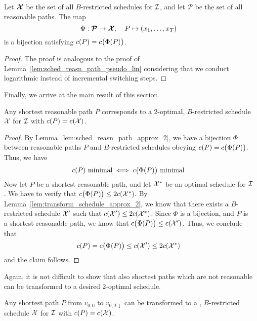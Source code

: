 \begin{lem}\label{lem:sched_reasn_path_approx_2}
Let $\bm{\mathcal{X}}$ be the set of all $B$-restricted schedules for $\mathcal{I}$, and let $\bm{\mathcal{P}}$ be the set of all reasonable paths. The map
\begin{equation*}
	\Phi:\bm{\mathcal{P}}\rightarrow\bm{\mathcal{X}},\quad P\mapsto (x_1,\dotsc,x_T)
\end{equation*}
is a bijection satisfying $c(P)=c\bigl(\Phi(P)\bigr)$.
\end{lem}
\begin{proof}
The proof is analogous to the proof of Lemma~\ref{lem:sched_reasn_path_pseudo_lin} considering that we conduct logarithmic instead of incremental switching steps.
\end{proof}
Finally, we arrive at the main result of this section.
\begin{thm}\label{thm:approx_2}
Any shortest reasonable path $P$ corresponds to a 2-optimal, $B$-restricted schedule $\mathcal{X}$ for $\mathcal{I}$ with $c(P)=c(\mathcal{X})$.
\end{thm} 
\begin{proof}
By Lemma~\ref{lem:sched_reasn_path_approx_2}, we have a bijection $\Phi$ between reasonable paths $P$ and $B$-restricted schedules obeying $c(P)=c\bigl(\Phi(P)\bigr)$. Thus, we have 
\begin{equation*}
	c(P)\text{ minimal}\iff c\bigl(\Phi(P)\big)\text{ minimal}
\end{equation*}
Now let $P$ be a shortest reasonable path, and let $\mathcal{X}^*$ be an optimal schedule for $\mathcal{I}$. We have to verify that $c\bigl(\Phi(P)\bigr)\le 2c(\mathcal{X}^*)$. By Lemma~\ref{lem:transform_schedule_approx_2}, we know that there exists a $B$-restricted schedule $\mathcal{X}'$ such that $c(\mathcal{X}')\le 2c(\mathcal{X}^*)$. Since $\Phi$ is a bijection, and $P$ is a shortest reasonable path, we know that $c\bigl(\Phi(P)\bigr)\le c(\mathcal{X}')$. Thus, we conclude that 
\begin{equation*}
	c(P)=c\bigl(\Phi(P)\bigr)\le c(\mathcal{X}')\le 2c(\mathcal{X}^*)
\end{equation*}
and the claim follows.
\end{proof}
Again, it is not difficult to show that also shortest paths which are not reasonable can be transformed to a desired 2-optimal schedule.
\begin{cor}\label{cor:approx_2_sched_short_path}
Any shortest path $P$ from $v_{0,0}$ to $v_{0,T\downarrow}$ can be transformed to a , $B$-restricted schedule $\mathcal{X}$ for $\mathcal{I}$ with $c(P)=c(\mathcal{X})$.
\end{cor}
